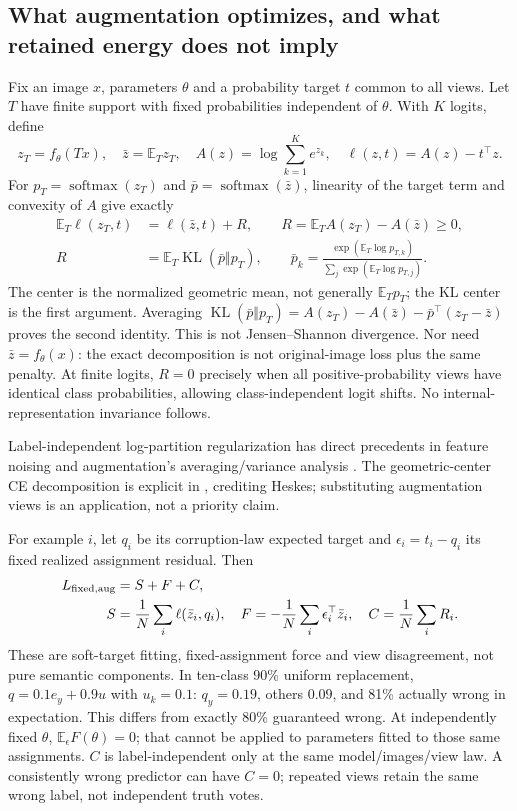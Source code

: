 \documentclass[10pt]{article}
\newcommand{\E}{\mathbb{E}}
\begin{document}
\subsection{What augmentation optimizes, and what retained energy does not imply}
Fix an image $x$, parameters $\theta$ and a probability target $t$ common to all views. Let $T$ have finite support with fixed probabilities independent of $\theta$. With $K$ logits, define
\begin{equation}
z_T=f_\theta(Tx),\quad \bar z=\E_Tz_T,\quad
A(z)=\log\sum_{k=1}^K e^{z_k},\quad
\ell(z,t)=A(z)-t^\top z.
\end{equation}
For $p_T=\operatorname{softmax}(z_T)$ and $\bar p=\operatorname{softmax}(\bar z)$, linearity of the target term and convexity of $A$ give exactly
\begin{align}
\E_T\ell(z_T,t)&=\ell(\bar z,t)+R,\qquad R=\E_TA(z_T)-A(\bar z)\geq0,\label{eq:view-objective}\\
R&=\E_T\operatorname{KL}(\bar p\Vert p_T),\qquad
\bar p_k=\frac{\exp(\E_T\log p_{T,k})}{\sum_j\exp(\E_T\log p_{T,j})}.\label{eq:view-kl}
\end{align}
The center is the normalized geometric mean, not generally $\E_Tp_T$; the KL center is the first argument. Averaging $\operatorname{KL}(\bar p\Vert p_T)=A(z_T)-A(\bar z)-\bar p^\top(z_T-\bar z)$ proves the second identity. This is not Jensen--Shannon divergence. Nor need $\bar z=f_\theta(x)$: the exact decomposition is not original-image loss plus the same penalty. At finite logits, $R=0$ precisely when all positive-probability views have identical class probabilities, allowing class-independent logit shifts. No internal-representation invariance follows.

Label-independent log-partition regularization has direct precedents in feature noising \citep[\S2, Eqs.~4--6]{wager2013dropout} and augmentation's averaging/variance analysis \citep[\S\S4.1--4.2]{dao2019augmentation}. The geometric-center CE decomposition is explicit in \citet[Appendix B.3, Eqs.~32--33]{wood2023diversity}, crediting Heskes; substituting augmentation views is an application, not a priority claim.

For example $i$, let $q_i$ be its corruption-law expected target and $\epsilon_i=t_i-q_i$ its fixed realized assignment residual. Then
\begin{align}
L_{\rm fixed,aug}&=S+F+C,\\
S&=\frac1N\sum_i\ell(\bar z_i,q_i),\quad
F=-\frac1N\sum_i\epsilon_i^\top\bar z_i,\quad
C=\frac1N\sum_iR_i.
\end{align}
These are soft-target fitting, fixed-assignment force and view disagreement, not pure semantic components. In ten-class 90\% uniform replacement, $q=0.1e_y+0.9u$ with $u_k=0.1$: $q_y=0.19$, others $0.09$, and 81\% actually wrong in expectation. This differs from exactly 80\% guaranteed wrong. At independently fixed $\theta$, $\E_\epsilon F(\theta)=0$; that cannot be applied to parameters fitted to those same assignments. $C$ is label-independent only at the same model/images/view law. A consistently wrong predictor can have $C=0$; repeated views retain the same wrong label, not independent truth votes.
\end{document}
